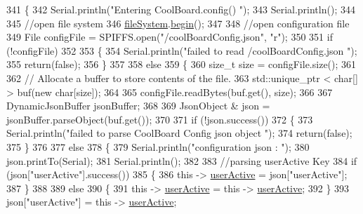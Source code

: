 \begin{DoxyCode}
341 \{
342     Serial.println(\textcolor{stringliteral}{"Entering CoolBoard.config() "});
343     Serial.println();
344 
345     \textcolor{comment}{//open file system}
346     \hyperlink{classCoolBoard_a42c2586fbb13ff7f06538e9284e8538d}{fileSystem}.\hyperlink{classCoolFileSystem_a6ba6f666ed4c530174f8569d2c636748}{begin}();
347     
348     \textcolor{comment}{//open configuration file}
349     File configFile = SPIFFS.open(\textcolor{stringliteral}{"/coolBoardConfig.json"}, \textcolor{stringliteral}{"r"});
350     
351     \textcolor{keywordflow}{if} (!configFile)
352 
353     \{
354         Serial.println(\textcolor{stringliteral}{"failed to read /coolBoardConfig.json  "});
355         \textcolor{keywordflow}{return}(\textcolor{keyword}{false});
356     \}
357 
358     \textcolor{keywordflow}{else}
359     \{
360         \textcolor{keywordtype}{size\_t} size = configFile.size();
361 
362         \textcolor{comment}{// Allocate a buffer to store contents of the file.}
363         std::unique\_ptr < char[] > buf(\textcolor{keyword}{new} \textcolor{keywordtype}{char}[size]);
364 
365         configFile.readBytes(buf.get(), size);
366 
367         DynamicJsonBuffer jsonBuffer;
368 
369         JsonObject & json = jsonBuffer.parseObject(buf.get());
370 
371         \textcolor{keywordflow}{if} (!json.success())
372         \{
373             Serial.println(\textcolor{stringliteral}{"failed to parse CoolBoard Config json object "});
374             \textcolor{keywordflow}{return}(\textcolor{keyword}{false});
375         \}
376 
377         \textcolor{keywordflow}{else}
378         \{   
379             Serial.println(\textcolor{stringliteral}{"configuration json : "});
380             json.printTo(Serial);
381             Serial.println();
382             
383             \textcolor{comment}{//parsing userActive Key}
384             \textcolor{keywordflow}{if} (json[\textcolor{stringliteral}{"userActive"}].success())
385             \{
386                 \textcolor{keyword}{this} -> \hyperlink{classCoolBoard_a6395459131d6889a3005f79c7a35e964}{userActive} = json[\textcolor{stringliteral}{"userActive"}];
387             \}
388 
389             \textcolor{keywordflow}{else}
390             \{
391                 \textcolor{keyword}{this} -> \hyperlink{classCoolBoard_a6395459131d6889a3005f79c7a35e964}{userActive} = \textcolor{keyword}{this} -> \hyperlink{classCoolBoard_a6395459131d6889a3005f79c7a35e964}{userActive};
392             \}
393             json[\textcolor{stringliteral}{"userActive"}] = \textcolor{keyword}{this} -> \hyperlink{classCoolBoard_a6395459131d6889a3005f79c7a35e964}{userActive};

\end{DoxyCode}
